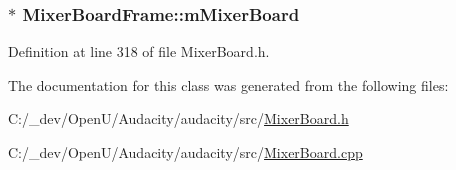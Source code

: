 \subsubsection[{\texorpdfstring{m\+Mixer\+Board}{mMixerBoard}}]{$\ast$ Mixer\+Board\+Frame\+::m\+Mixer\+Board}\hypertarget{class_mixer_board_frame_a90e00fa4b175474ee067ff4bf3bef8e6}{}\label{class_mixer_board_frame_a90e00fa4b175474ee067ff4bf3bef8e6}


Definition at line 318 of file Mixer\+Board.\+h.



The documentation for this class was generated from the following files\+:\begin{DoxyCompactItemize}
\item 
C\+:/\+\_\+dev/\+Open\+U/\+Audacity/audacity/src/\hyperlink{_mixer_board_8h}{Mixer\+Board.\+h}\item 
C\+:/\+\_\+dev/\+Open\+U/\+Audacity/audacity/src/\hyperlink{_mixer_board_8cpp}{Mixer\+Board.\+cpp}\end{DoxyCompactItemize}

